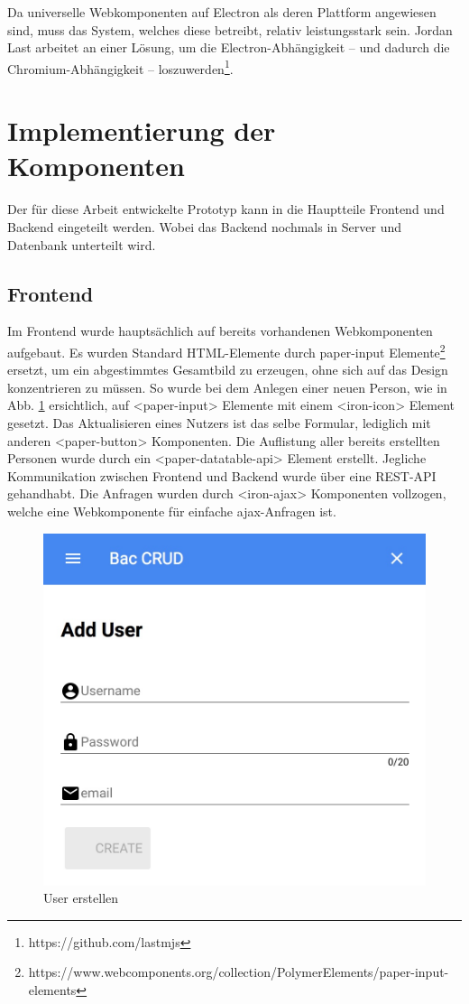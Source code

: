 Da universelle Webkomponenten auf Electron als deren Plattform angewiesen sind, muss das System, welches diese betreibt, relativ leistungsstark sein. Jordan Last arbeitet an einer Lösung, um die Electron-Abhängigkeit -- und dadurch die Chromium-Abhängigkeit -- loszuwerden\footnote{https://github.com/lastmjs}.

\section{Implementierung der Komponenten}
Der für diese Arbeit entwickelte Prototyp kann in die Hauptteile Frontend und Backend eingeteilt werden. Wobei das Backend nochmals in Server und Datenbank unterteilt wird. 

\subsection{Frontend}
Im Frontend wurde hauptsächlich auf bereits vorhandenen Webkomponenten aufgebaut. Es wurden Standard HTML-Elemente durch paper-input Elemente\footnote{https://www.webcomponents.org/collection/PolymerElements/paper-input-elements} ersetzt, um ein abgestimmtes Gesamtbild zu erzeugen, ohne sich auf das Design konzentrieren zu müssen. So wurde bei dem Anlegen einer neuen Person, wie in Abb. \ref{fig:user_create} ersichtlich, auf <paper-input> Elemente mit einem <iron-icon> Element gesetzt. Das Aktualisieren eines Nutzers ist das selbe Formular, lediglich mit anderen <paper-button> Komponenten. Die Auflistung aller bereits erstellten Personen wurde durch ein <paper-datatable-api> Element erstellt. Jegliche Kommunikation zwischen Frontend und Backend wurde über eine REST-API gehandhabt. Die Anfragen wurden durch <iron-ajax> Komponenten vollzogen, welche eine Webkomponente für einfache ajax-Anfragen ist.
\begin{figure}
	\centering
	\includegraphics[width=0.5\linewidth]{images/user_create.jpeg}
	\caption{User erstellen}
	\label{fig:user_create}
\end{figure}

